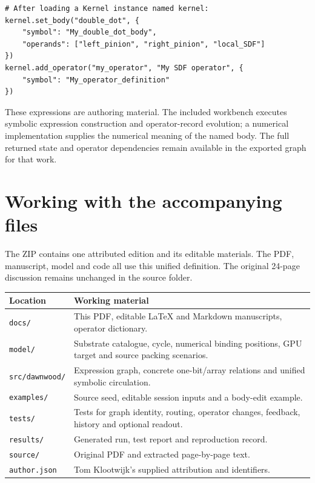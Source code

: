\documentclass[11pt,a4paper]{article}
\newcommand{\code}[1]{\texttt{#1}}
\begin{document}
\begin{lstlisting}
# After loading a Kernel instance named kernel:
kernel.set_body("double_dot", {
    "symbol": "My_double_dot_body",
    "operands": ["left_pinion", "right_pinion", "local_SDF"]
})
kernel.add_operator("my_operator", "My SDF operator", {
    "symbol": "My_operator_definition"
})
\end{lstlisting}

These expressions are authoring material. The included workbench executes symbolic expression construction and operator-record evolution; a numerical implementation supplies the numerical meaning of the named body. The full returned state and operator dependencies remain available in the exported graph for that work.
\clearpage

\section{Working with the accompanying files}
The ZIP contains one attributed edition and its editable materials. The PDF, manuscript, model and code all use this unified definition. The original 24-page discussion remains unchanged in the source folder.

\begin{tabularx}{\linewidth}{@{}P{37mm}Y@{}}
\toprule
\textbf{Location} & \textbf{Working material}\\
\midrule
\code{docs/} & This PDF, editable LaTeX and Markdown manuscripts, operator dictionary.\\
\code{model/} & Substrate catalogue, cycle, numerical binding positions, GPU target and source packing scenarios.\\
\code{src/dawnwood/} & Expression graph, concrete one-bit/array relations and unified symbolic circulation.\\
\code{examples/} & Source seed, editable session inputs and a body-edit example.\\
\code{tests/} & Tests for graph identity, routing, operator changes, feedback, history and optional readout.\\
\code{results/} & Generated run, test report and reproduction record.\\
\code{source/} & Original PDF and extracted page-by-page text.\\
\code{author.json} & Tom Klootwijk's supplied attribution and identifiers.\\
\bottomrule
\end{tabularx}
\end{document}
